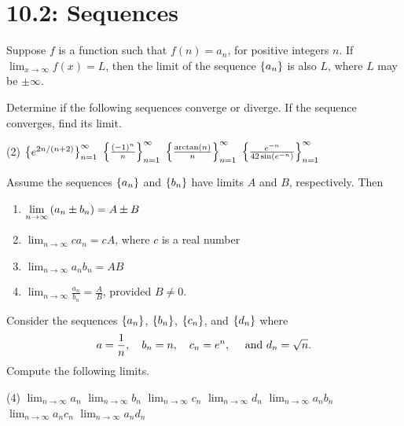 \documentclass[../mathNotesPreamble]{subfiles}
\begin{document}
  \section{10.2: Sequences}

  \begin{thmBox*}
    Suppose $f$ is a function such that $f(n)=a_n$, for positive integers $n$. If \newline$\displaystyle \lim_{x\to \infty} f(x)=L$, then the limit of the sequence ${\left\{a_n\right\}}$ is also $L$, where $L$ may be $\pm\infty$.
  \end{thmBox*}

  \begin{ex*}
    Determine if the following sequences converge or diverge. If the sequence converges, find its limit.
  \end{ex*}
  \begin{tasks}[after-item-skip=\stretch{1}, label=, item-indent=0pt](2)
    \task ${\left\{e^{2n/(n+2)}\right\}}_{n=1}^{\infty}$
    \task ${\left\{\frac{(-1)^n}{n}\right\}}_{n=1}^{\infty}$
    \task ${\left\{\frac{\arctan(n)}{n}\right\}}_{n=1}^{\infty}$
    \task ${\left\{\frac{e^{-n}}{42\sin(e^{-n})}\right\}}_{n=1}^{\infty}$
  \end{tasks}
  \pagebreak

  \begin{thmBox*}
    Assume the sequences ${\left\{a_n\right\}}$ and ${\left\{b_n\right\}}$ have limits $A$ and $B$, respectively. Then
      \begin{enumerate}
        \item $\displaystyle \lim_{n\to \infty}{\left(a_n\pm b_n\right)}=A\pm B$
        \item $\displaystyle \lim_{n\to \infty} ca_n=cA$, where $c$ is a real number
        \item $\displaystyle \lim_{n\to \infty} a_nb_n=AB$
        \item $\displaystyle \lim_{n\to \infty} \frac{a_n}{b_n}= \frac{A}{B}$, provided $B\neq0$.
      \end{enumerate}
  \end{thmBox*}

  \begin{ex*}
    Consider the sequences ${\left\{a_n\right\}}$, ${\left\{b_n\right\}}$, ${\left\{c_n\right\}}$, and ${\left\{d_n\right\}}$ where
      \[a=\frac{1}{n},\quad b_n=n,\quad c_n=e^n,\quad \textnormal{ and } d_n=\sqrt{n}.\]
    Compute the following limits.
  \end{ex*}
  \begin{tasks}[after-item-skip=\stretch{1}, label=\Alph*., item-indent=17.5pt](4)
    \task $\displaystyle \lim_{n\to \infty} a_n$
    \task $\displaystyle \lim_{n\to \infty} b_n$
    \task $\displaystyle \lim_{n\to \infty} c_n$
    \task $\displaystyle \lim_{n\to \infty} d_n$
    \task $\displaystyle \lim_{n\to \infty} a_nb_n$
    \task $\displaystyle \lim_{n\to \infty} a_nc_n$
    \task $\displaystyle \lim_{n\to \infty} a_nd_n$
  \end{tasks}
\end{document}
